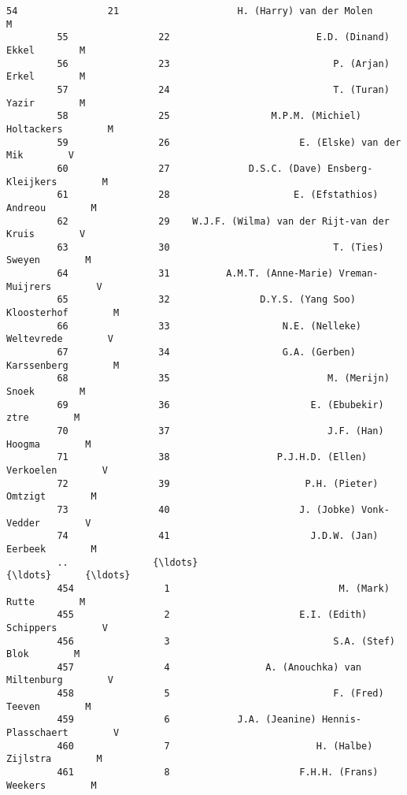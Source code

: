 \documentclass{article}
\begin{document}
\begin{Verbatim}[commandchars=\\\{\}]
         54                21                     H. (Harry) van der Molen        M   
         55                22                          E.D. (Dinand) Ekkel        M   
         56                23                             P. (Arjan) Erkel        M   
         57                24                             T. (Turan) Yazir        M   
         58                25                  M.P.M. (Michiel) Holtackers        M   
         59                26                       E. (Elske) van der Mik        V   
         60                27              D.S.C. (Dave) Ensberg-Kleijkers        M   
         61                28                      E. (Efstathios) Andreou        M   
         62                29    W.J.F. (Wilma) van der Rijt-van der Kruis        V   
         63                30                             T. (Ties) Sweyen        M   
         64                31          A.M.T. (Anne-Marie) Vreman-Muijrers        V   
         65                32                D.Y.S. (Yang Soo) Kloosterhof        M   
         66                33                    N.E. (Nelleke) Weltevrede        V   
         67                34                    G.A. (Gerben) Karssenberg        M   
         68                35                            M. (Merijn) Snoek        M   
         69                36                         E. (Ebubekir) ztre        M   
         70                37                            J.F. (Han) Hoogma        M   
         71                38                   P.J.H.D. (Ellen) Verkoelen        V   
         72                39                        P.H. (Pieter) Omtzigt        M   
         73                40                       J. (Jobke) Vonk-Vedder        V   
         74                41                         J.D.W. (Jan) Eerbeek        M   
         ..               {\ldots}                                          {\ldots}      {\ldots}   
         454                1                              M. (Mark) Rutte        M   
         455                2                       E.I. (Edith) Schippers        V   
         456                3                             S.A. (Stef) Blok        M   
         457                4                 A. (Anouchka) van Miltenburg        V   
         458                5                             F. (Fred) Teeven        M   
         459                6            J.A. (Jeanine) Hennis-Plasschaert        V   
         460                7                          H. (Halbe) Zijlstra        M   
         461                8                       F.H.H. (Frans) Weekers        M   

\end{Verbatim}
\end{document}
